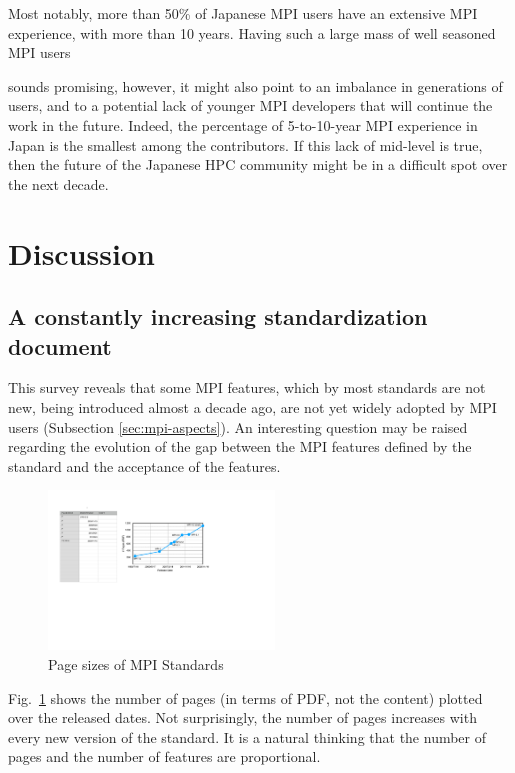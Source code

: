\documentclass[preprint,5p,times]{elsarticle}
\newcommand{\revision}[2]{{\color{blue}#2}}
\def\countries{contributors\xspace{}}%
\begin{document}
Most notably, more than 50\% of Japanese MPI users have an extensive MPI
experience, with more than 10 years. Having such a large mass of well seasoned
MPI users {\revision{sound}{sounds} promising, however, it might also point to an imbalance in
generations of users, and to a potential lack of younger MPI developers that
will continue the work in the future.
Indeed, the percentage of 5-to-10-year MPI experience in Japan is the smallest
among the \countries. If this lack of mid-level is true, then the
future of \revision{}{the}
Japanese HPC community might be in a difficult spot over the next decade.

\section{Discussion}

\subsection{A constantly increasing standardization document}

This survey reveals that some MPI features, which by most standards are not new\revision{}{,}
being introduced almost a decade ago, are not yet widely \revision{accepted}{adopted} by MPI users
(Subsection \ref{sec:mpi-aspects}). An interesting question may be raised
regarding the evolution of the gap between the MPI features defined by the
standard and the acceptance of the features.

\begin{figure}[tb]
\begin{center}
\includegraphics[width=6cm]{Figs/MPI-Standards.pdf}
\caption{Page sizes of MPI Standards}
\label{fig:mpi-standards}
\vspace{-3mm}%
\end{center}
\end{figure}

Fig.~\ref{fig:mpi-standards} shows the number of pages (in terms of PDF, not the
content) plotted over the released dates. Not surprisingly, the number of pages
increases with every new version of the standard. It is a natural thinking that
the number of pages and the number of features are proportional.

}
\end{document}
